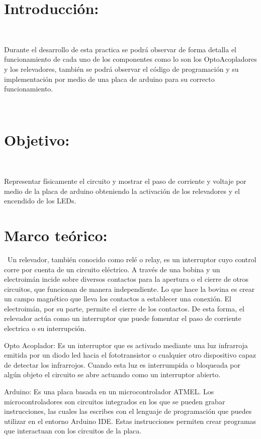 \documentclass[12pt,letterpaper]{article}
\begin{document}
\newpage

\section{Introducción:}
\

Durante el desarrollo de esta practica se podrá observar de forma detalla el funcionamiento de cada uno de los componentes como lo son los OptoAcopladores y los relevadores, también se podrá observar el código de programación y su implementación por medio de una placa de arduino para su correcto funcionamiento.
\

\

\section{Objetivo:}
\

Representar físicamente el circuito y mostrar el paso de corriente y voltaje por medio de la placa de arduino obteniendo la activación de los relevadores y el encendido de los LEDs.
\

\section{Marco teórico:}
\
Un relevador, también conocido como relé o relay, es un interruptor cuyo control corre por cuenta de un circuito eléctrico. A través de una bobina y un electroimán incide sobre diversos contactos para la apertura o el cierre de otros circuitos, que funcionan de manera independiente. Lo que hace la bovina es crear un campo magnético que lleva los contactos a establecer una conexión. El electroimán, por su parte, permite el cierre de los contactos. De esta forma, el relevador actúa como un interruptor que puede fomentar el paso de corriente electrica o su interrupción.
\

Opto Acoplador: Es un interruptor que es activado mediante una luz infrarroja emitida por un diodo led hacia el fototransistor o cualquier otro dispositivo capaz de detectar los infrarrojos. Cuando esta luz es interrumpida o bloqueada por algún objeto el circuito se abre actuando como un interruptor abierto.
\

Arduino: Es una placa basada en un microcontrolador ATMEL. Los microcontroladores son circuitos integrados en los que se pueden grabar instrucciones, las cuales las escribes con el lenguaje de programación que puedes utilizar en el entorno Arduino IDE. Estas instrucciones permiten crear programas que interactuan con los circuitos de la placa.
\end{document}
